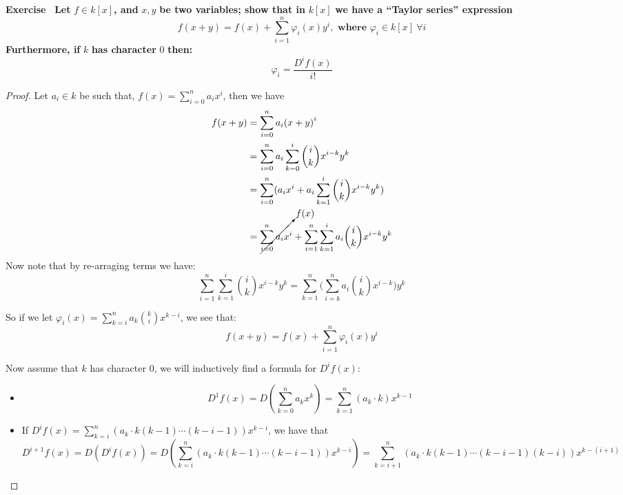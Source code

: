 \documentclass{article}
\theoremstyle{definition}
\theoremstyle{remark}
\theoremstyle{definition}
\newcounter{exercise}[subsection]
\newenvironment{exercise}{\setcounter{equation}{0}\refstepcounter{exercise}\textbf{Exercise~\theexercise}}{}
\begin{document}
    \begin{exercise}
        \textbf{Let }$f\in k[x]$\textbf{, and }$x,y$\textbf{ be two variables; show that in }$k[x]$\textbf{ we have a ``Taylor series'' expression}
        \begin{equation*}
            f(x+y) = f(x) + \sum_{i=1}^n\varphi_i(x)y^i, \textbf{ where }\varphi_i\in k[x] \ \forall i
        \end{equation*}
    \textbf{Furthermore, if }$k$\textbf{ has character }$0$\textbf{ then: }\begin{equation*}
        \varphi_i = \frac{D^i f(x)}{i!}
    \end{equation*}  
    
    \begin{proof}
        Let $a_i\in k$ be such that, $f(x) = \sum_{i=0}^n{a_i}x^i$, then we have
        \begin{align}
            f(x+y) &= \sum_{i=0}^n {a_i}{(x+y)}^i\\
                   &= \sum_{i=0}^n a_i \sum_{k=0}^i \binom{i}{k}x^{i-k}y^k\\
                   &= \sum_{i=0}^n ({a_i}x^i + a_i\sum_{k=1}^i \binom{i}{k}x^{i-k}y^k)\\
                   &= \cancelto{f(x)}{\sum_{i=0}^n {a_i}x^i} + \sum_{i=1}^n \sum_{k=1}^i a_i\binom{i}{k}x^{i-k}y^k\\
        \end{align}
        Now note that by re-arraging terms we have: \begin{equation}
            \sum_{i=1}^n \sum_{k=1}^i \binom{i}{k}x^{i-k}y^k = \sum_{k=1}^n \bigg(\sum_{i=k}^n a_i\binom{i}{k}x^{i-k}\bigg)y^k
        \end{equation}

        So if we let $\varphi_i(x) = \sum_{k=i}^n a_k\binom{k}{i}x^{k-i}$, we see that:\begin{equation}
            f(x+y) = f(x) + \sum_{i=1}^n\varphi_i(x)y^i
        \end{equation}

        Now assume that $k$ has character $0$, we will inductively find a formula for ${D^i}f(x)$:\begin{itemize}
            \item \begin{equation}D^1f(x) = D(\sum_{k=0}^n a_k x^k) = \sum_{k=1}^n (a_k\cdot k)x^{k-1}\end{equation}
            \item If ${D^i}f(x) = \sum_{k=i}^n (a_k\cdot k(k-1)\cdots (k-i-1))x^{k-i}$, we have that \begin{equation}
                D^{i+1}f(x) = D({D^i}f(x)) = D(\sum_{k=i}^n (a_k\cdot k(k-1)\cdots (k-i-1))x^{k-i}) = \sum_{k=i+1}^n (a_k\cdot k(k-1)\cdots (k-i-1)(k-i))x^{k-(i+1)}
            \end{equation}


\end{itemize}
\end{proof}
\end{exercise}
\end{document}
